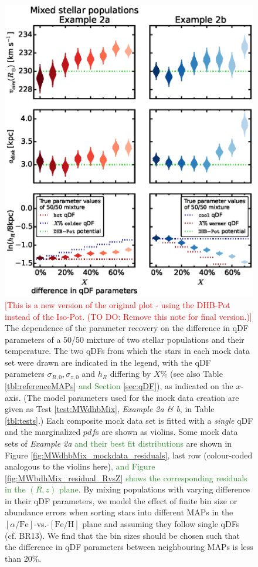 \documentclass[iop,revtex4]{emulateapj}
\newcommand{\pdf}{\ensuremath{pdf}}
\newcommand{\MAPs}{MAPs}
\newcommand{\NEW}[1]{\textcolor{ForestGreen}{#1}}
\newcommand{\NOTE}[1]{\textcolor{Red}{#1}}
\begin{document}
\begin{figure}[!htbp]
\centering
\includegraphics[scale=0.55]{figs/MWbdhMixDiff_violins.eps}
\caption{\NOTE{[This is a new version of the original plot - using the DHB-Pot instead of the Iso-Pot. (TO DO: Remove this note for final version.)]} The dependence of the parameter recovery on the difference in qDF parameters of a 50/50 mixture of two stellar populations and their temperature. The two qDFs from which the stars in each mock data set were drawn are indicated in the legend, with the qDF parameters $\sigma_{R,0}, \sigma_{z,0}$ and $h_R$ differing by $X\%$ (see also Table \ref{tbl:referenceMAPs} \NEW{and Section \ref{sec:qDF}}), as indicated on the $x$-axis. (The model parameters used for the mock data creation are given as Test \ref{test:MWdhbMix}, \emph{Example 2a \& b}, in Table \ref{tbl:tests}.) Each composite mock data set is fitted with a \emph{single} qDF and the marginalized \pdf{}s are shown as violins. Some mock data sets of \emph{Example 2a} \NEW{and their best fit distributions} are shown in Figure \ref{fig:MWdhbMix_mockdata_residuals}, last row (colour-coded analogous to the violins here)\NEW{, and Figure \ref{fig:MWbdhMix_residual_RvsZ} shows the corresponding residuals in the $(R,z)$ plane}. By mixing populations with varying difference in their qDF parameters, we model the effect of finite bin size or abundance errors when sorting stars into different \MAPs{} in the $[\alpha/\mathrm{Fe}]$-vs.-$[\mathrm{Fe}/\mathrm{H}]$ plane and assuming they follow single qDFs (cf. BR13). We find that the bin sizes should be chosen such that the difference in qDF parameters between neighbouring \MAPs{} is less than 20\%.} 
\label{fig:MWdhbMixDiff}
\end{figure}
\end{document}
